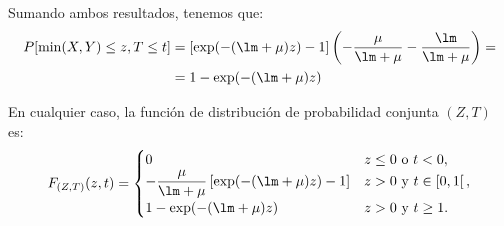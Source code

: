 \begin{ejercicio}
\begin{itemize}
\begin{description}
            Sumando ambos resultados, tenemos que:
            \begin{align*}
                P[\min(X,Y)\leq z,T\leq t]&= [\exp(-(\lm+\mu)z)-1]\left(-\dfrac{\mu}{\lm+\mu} -\dfrac{\lm}{\lm+\mu}\right)
                =\\&= 1-\exp(-(\lm+\mu)z)
            \end{align*}
        \end{description}
    \end{itemize}

    En cualquier caso, la función de distribución de probabilidad conjunta $(Z,T)$ es:
    \begin{equation*}
        F_{(Z,T)}(z,t) = \begin{cases}
            0 & z\leq 0 \text{ o } t<0, \\
            -\dfrac{\mu}{\lm+\mu} \left[\exp(-(\lm+\mu)z)-1\right] & z>0 \text{ y } t\in \left[0,1\right[, \\
            1-\exp(-(\lm+\mu)z) & z>0 \text{ y } t\geq 1.
        \end{cases}
    \end{equation*}
\end{ejercicio}

